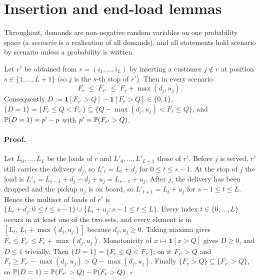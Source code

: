 
\section{Insertion and end-load lemmas}\label{app:lemmas}

Throughout, demands are non-negative random variables on one probability space (a \emph{scenario} is a realisation of all demands), and all statements hold scenario by scenario unless a probability is written.

\begin{lemma}\label{lem:insertionA}
Let $r'$ be obtained from $r=(i_1,\dots,i_L)$ by inserting a customer $j\notin r$ at position $s\in\{1,\dots,L+1\}$ (so $j$ is the $s$-th stop of $r'$). Then in every scenario
\[
F_r\;\le\;F_{r'}\;\le\;F_r+\max(d_j,u_j).
\]
Consequently $D:=\mathbf 1[F_{r'}>Q]-\mathbf 1[F_r>Q]\in\{0,1\}$, $\{D=1\}=\{F_r\le Q<F_{r'}\}\subseteq\{Q-\max(d_j,u_j)<F_r\le Q\}$, and $\P(D=1)=p'-p$ with $p'=\P(F_{r'}>Q)$.
\end{lemma}
\paragraph{Proof.} Let $L_0,\dots,L_L$ be the loads of $r$ and $L'_0,\dots,L'_{L+1}$ those of $r'$. Before $j$ is served, $r'$ still carries the delivery $d_j$, so $L'_t=L_t+d_j$ for $0\le t\le s-1$. At the stop of $j$ the load is $L'_s=L_{s-1}+d_j-d_j+u_j=L_{s-1}+u_j$. After $j$, the delivery has been dropped and the pickup $u_j$ is on board, so $L'_{t+1}=L_t+u_j$ for $s-1\le t\le L$. Hence the multiset of loads of $r'$ is $\{L_t+d_j:0\le t\le s-1\}\cup\{L_t+u_j:s-1\le t\le L\}$. Every index $t\in\{0,\dots,L\}$ occurs in at least one of the two sets, and every element is in $[L_t,\,L_t+\max(d_j,u_j)]$ because $d_j,u_j\ge 0$. Taking maxima gives $F_r\le F_{r'}\le F_r+\max(d_j,u_j)$. Monotonicity of $x\mapsto\mathbf 1[x>Q]$ gives $D\ge0$, and $D\le 1$ trivially. Then $\{D=1\}=\{F_r\le Q<F_{r'}\}$; on it $F_{r'}>Q$ and $F_r\ge F_{r'}-\max(d_j,u_j)>Q-\max(d_j,u_j)$. Finally $\{F_r>Q\}\subseteq\{F_{r'}>Q\}$, so $\P(D=1)=\P(F_{r'}>Q)-\P(F_r>Q)$. \hfill$\square$

